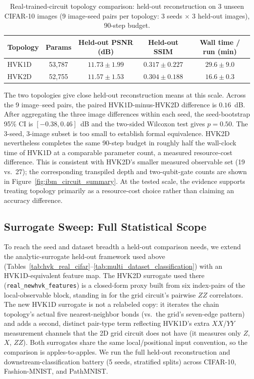 \documentclass[11pt]{article}
\begin{document}
\begin{table}[H]
\centering
\caption{Real-trained-circuit topology comparison: held-out reconstruction on 3 unseen CIFAR-10 images (9 image-seed pairs per topology: 3 seeds $\times$ 3 held-out images), 90-step budget.}
\label{tab:topology_real_circuit}
\scriptsize
\begin{tabular}{lcccc}
\toprule
Topology & Params & Held-out PSNR (dB) & Held-out SSIM & Wall time / run (min) \\
\midrule
HVK1D & 53{,}787 & $11.73\pm1.99$ & $0.317\pm0.227$ & $29.6\pm9.0$ \\
HVK2D & 52{,}755 & $11.57\pm1.53$ & $0.304\pm0.188$ & $16.6\pm0.3$ \\
\bottomrule
\end{tabular}
\end{table}

The two topologies give close held-out reconstruction means at this scale. Across the 9 image--seed pairs, the paired HVK1D-minus-HVK2D difference is $0.16$~dB. After aggregating the three image differences within each seed, the seed-bootstrap 95\% CI is $[-0.38,0.46]$~dB and the two-sided Wilcoxon test gives $p=0.50$. The 3-seed, 3-image subset is too small to establish formal equivalence. HVK2D nevertheless completes the same 90-step budget in roughly half the wall-clock time of HVK1D at a comparable parameter count, a measured resource-cost difference. This is consistent with HVK2D's smaller measured observable set (19 vs.\ 27); the corresponding transpiled depth and two-qubit-gate counts are shown in Figure~\ref{fig:ibm_circuit_summary}. At the tested scale, the evidence supports treating topology primarily as a resource-cost choice rather than claiming an accuracy difference.

\subsection{Surrogate Sweep: Full Statistical Scope}
\label{sec:topology_surrogate}
To reach the seed and dataset breadth a held-out comparison needs, we extend the analytic-surrogate held-out framework used above (Tables~\ref{tab:hvk_real_cifar}--\ref{tab:multi_dataset_classification}) with an HVK1D-equivalent feature map. The HVK2D surrogate used there (\texttt{real\_newhvk\_features}) is a closed-form proxy built from six index-pairs of the local-observable block, standing in for the grid circuit's pairwise $ZZ$ correlators. The new HVK1D surrogate is not a relabeled copy: it iterates the chain topology's actual five nearest-neighbor bonds (vs.\ the grid's seven-edge pattern) and adds a second, distinct pair-type term reflecting HVK1D's extra $XX$/$YY$ measurement channels that the 2D grid circuit does not have (it measures only $Z$, $X$, $ZZ$). Both surrogates share the same local/positional input convention, so the comparison is apples-to-apples. We run the full held-out reconstruction and downstream-classification battery (5 seeds, stratified splits) across CIFAR-10, Fashion-MNIST, and PathMNIST.
\end{document}
